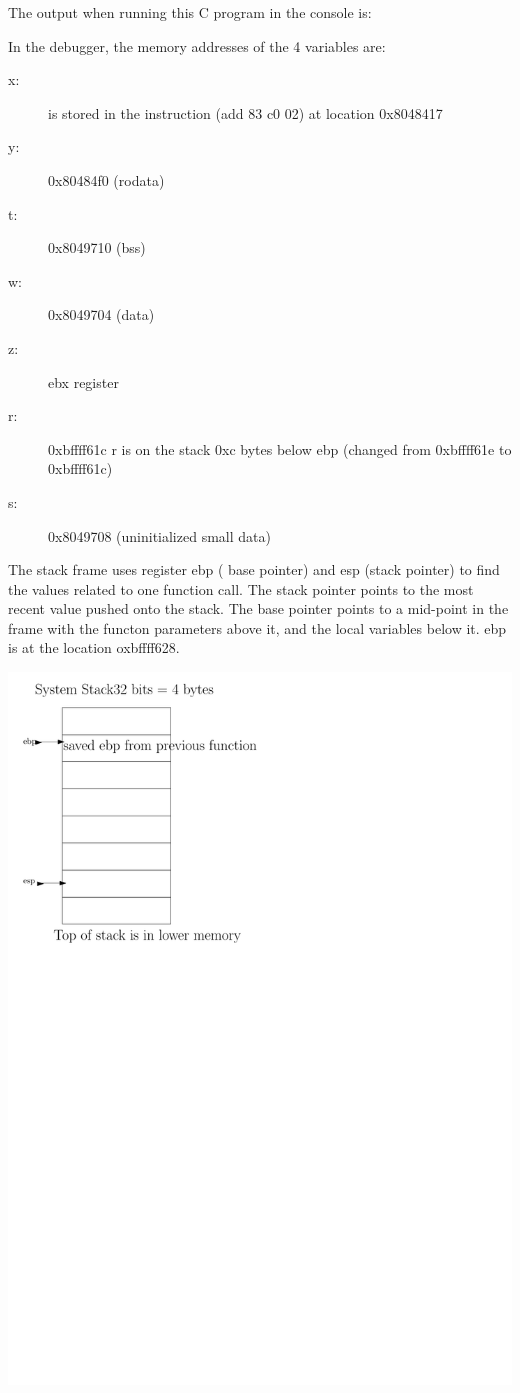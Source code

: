 \documentclass{article}
\begin{document}
The output when running this C program in the console is:

\clearpage


In the debugger, the memory addresses of the 4 variables are:
\begin{description}
\item[x:] is stored in the instruction (add 83 c0 02) at location 0x8048417
\item[y:] 0x80484f0 (rodata)
\item[t:] 0x8049710 (bss)
\item[w:] 0x8049704 (data)
\item[z:] ebx register
\item[r:] 0xbffff61c r is on the stack 0xc bytes below ebp (changed from 0xbffff61e to 0xbffff61c)
\item[s:] 0x8049708 (uninitialized small data)
\end{description}
The stack frame uses register ebp ( base pointer) and esp (stack pointer) to find the values related to one function call. The stack pointer points to the most recent value pushed onto the stack. The base pointer points to a mid-point in the frame with the functon parameters above it, and the local variables below it. ebp is at the location oxbffff628. 

\includegraphics{stackframe.pdf}
\end{document}
